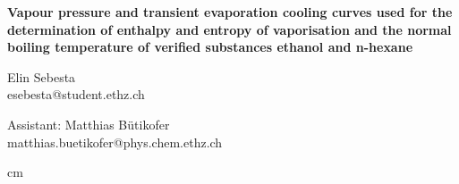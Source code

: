 \documentclass[a4paper,abstracton]{article}	                       %
\begin{document}

\begin{titlepage}
\thispagestyle{fancy} 
\renewcommand{\headrulewidth}{0.5pt}


	\begin{center}
 	\huge \textbf{Vapour pressure and transient evaporation cooling curves used for the determination of enthalpy and entropy of vaporisation and the normal boiling temperature of verified substances ethanol and n-hexane}
 	\vskip 1cm
	\end{center}
	
\begin{minipage}[t]{.49\linewidth}
\begin{center}
\large {Elin Sebesta} \\
\large {esebesta@student.ethz.ch}\\
\end{center}
\end{minipage}
\begin{minipage}[t]{.49\linewidth}
\begin{center}
\large Assistant: Matthias B\"utikofer\\
\large matthias.buetikofer@phys.chem.ethz.ch
\end{center}
\end{minipage}

 cm


\end{titlepage}
\end{document}
